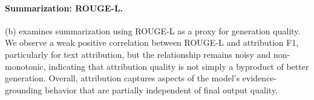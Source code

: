 \paragraph{Summarization: ROUGE-L.}
(b) examines summarization using ROUGE-L as a proxy for generation quality. We observe a weak positive correlation between ROUGE-L and attribution F1, particularly for text attribution, but the relationship remains noisy and non-monotonic, indicating that attribution quality is not simply a byproduct of better generation. Overall, attribution captures aspects of the model's evidence-grounding behavior that are partially independent of final output quality.